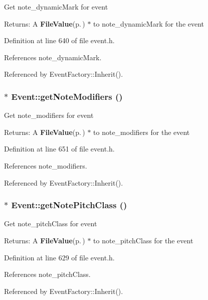 Get note\_\-dynamic\-Mark for event \begin{Desc}
\item[Returns:]A {\bf File\-Value}{\rm (p.\,\pageref{classFileValue})} $\ast$ to note\_\-dynamic\-Mark for the event \end{Desc}


Definition at line 640 of file event.h.

References note\_\-dynamic\-Mark.

Referenced by Event\-Factory::Inherit().
\subsubsection{$\ast$ Event::get\-Note\-Modifiers ()\hspace{0.3cm}{\tt  [inline]}}\label{classEvent_a80}


Get note\_\-modifiers for event \begin{Desc}
\item[Returns:]A {\bf File\-Value}{\rm (p.\,\pageref{classFileValue})} $\ast$ to note\_\-modifiers for the event \end{Desc}


Definition at line 651 of file event.h.

References note\_\-modifiers.

Referenced by Event\-Factory::Inherit().
\subsubsection{$\ast$ Event::get\-Note\-Pitch\-Class ()\hspace{0.3cm}{\tt  [inline]}}\label{classEvent_a76}


Get note\_\-pitch\-Class for event \begin{Desc}
\item[Returns:]A {\bf File\-Value}{\rm (p.\,\pageref{classFileValue})} $\ast$ to note\_\-pitch\-Class for the event \end{Desc}


Definition at line 629 of file event.h.

References note\_\-pitch\-Class.

Referenced by Event\-Factory::Inherit().
